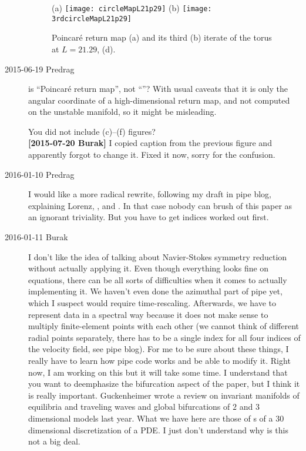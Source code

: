 \begin{description}
\begin{figure}
\begin{center}
        (a) \texttt{[image: circleMapL21p29]}
        (b) \texttt{[image: 3rdcircleMapL21p29]}
\end{center}
    \caption{
    Poincar\'e return map (a) and its third (b) iterate of the torus at
    $L=21.29$,  (d).
    }
    \label{f-CircleMaps}
\end{figure}

\item[2015-06-19 Predrag]
 is ``Poincar\'e return map'', not ``\PoincSec''?
With usual caveats that it is only the angular coordinate of a high-dimensional
return map, and not computed on the unstable manifold, so it might be misleading.

You did not include (c)--(f) figures?\\
\textbf{[2015-07-20 Burak]} I copied caption from the previous figure and
apparently forgot to change it. Fixed it now, sorry for the confusion.

\item[2016-01-10 Predrag]
        	I would like a more radical rewrite, following my draft in pipe blog,
        	explaining Lorenz, \KS, and \NS. In that case nobody can brush of this
        	paper as an ignorant triviality. But you have to get indices
        	worked out first.

\item[2016-01-11 Burak]
        	I don't like the idea of talking about Navier-Stokes symmetry reduction
        	without actually applying it. Even though everything looks fine on
        	equations, there can be all sorts of difficulties when it comes to
        	actually implementing it. We haven't even done the azimuthal part of
        	pipe yet, which I suspect would require time-rescaling. Afterwards,
        	we have to represent data in a spectral way because it does not
        	make sense to multiply finite-element points with each other
        	(we cannot think of different radial points separately, there has to
        	be a single index for all four indices of the velocity field, see
        	pipe blog). For me to be sure about these things, I really have to
        	learn how pipe code works and be able to modify it. Right now, I am
        	working on this but it will take some time. I understand that you
        	want to deemphasize the bifurcation aspect of the paper, but I think
        	it is really important. Guckenheimer \etal{} wrote a review
        	on invariant manifolds of equilibria and traveling waves and global
        	bifurcations of $2$ and $3$ dimensional models last year.
        	What we have here are those of \rpo s of a $30$ dimensional
        	discretization of a PDE. I just don't understand why is this not a big
        	deal.



\end{description}
